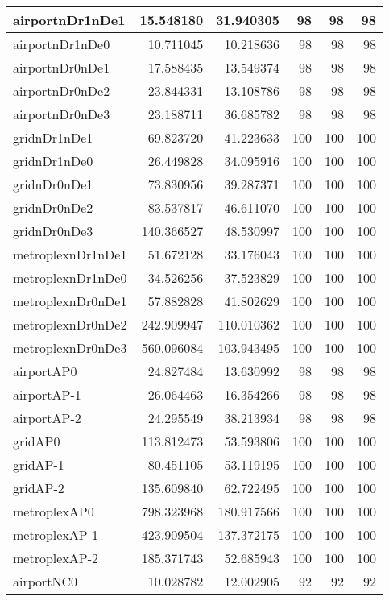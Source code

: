 \begin{longtable}{|l|r|r|r|r|r|}
\endlastfoot
airportnDr1nDe1 & 15.548180 & 31.940305 & 98 & 98 & 98 \\ \hline
airportnDr1nDe0 & 10.711045 & 10.218636 & 98 & 98 & 98 \\ \hline
airportnDr0nDe1 & 17.588435 & 13.549374 & 98 & 98 & 98 \\ \hline
airportnDr0nDe2 & 23.844331 & 13.108786 & 98 & 98 & 98 \\ \hline
airportnDr0nDe3 & 23.188711 & 36.685782 & 98 & 98 & 98 \\ \hline
gridnDr1nDe1 & 69.823720 & 41.223633 & 100 & 100 & 100 \\ \hline
gridnDr1nDe0 & 26.449828 & 34.095916 & 100 & 100 & 100 \\ \hline
gridnDr0nDe1 & 73.830956 & 39.287371 & 100 & 100 & 100 \\ \hline
gridnDr0nDe2 & 83.537817 & 46.611070 & 100 & 100 & 100 \\ \hline
gridnDr0nDe3 & 140.366527 & 48.530997 & 100 & 100 & 100 \\ \hline
metroplexnDr1nDe1 & 51.672128 & 33.176043 & 100 & 100 & 100 \\ \hline
metroplexnDr1nDe0 & 34.526256 & 37.523829 & 100 & 100 & 100 \\ \hline
metroplexnDr0nDe1 & 57.882828 & 41.802629 & 100 & 100 & 100 \\ \hline
metroplexnDr0nDe2 & 242.909947 & 110.010362 & 100 & 100 & 100 \\ \hline
metroplexnDr0nDe3 & 560.096084 & 103.943495 & 100 & 100 & 100 \\ \hline
airportAP0 & 24.827484 & 13.630992 & 98 & 98 & 98 \\ \hline
airportAP-1 & 26.064463 & 16.354266 & 98 & 98 & 98 \\ \hline
airportAP-2 & 24.295549 & 38.213934 & 98 & 98 & 98 \\ \hline
gridAP0 & 113.812473 & 53.593806 & 100 & 100 & 100 \\ \hline
gridAP-1 & 80.451105 & 53.119195 & 100 & 100 & 100 \\ \hline
gridAP-2 & 135.609840 & 62.722495 & 100 & 100 & 100 \\ \hline
metroplexAP0 & 798.323968 & 180.917566 & 100 & 100 & 100 \\ \hline
metroplexAP-1 & 423.909504 & 137.372175 & 100 & 100 & 100 \\ \hline
metroplexAP-2 & 185.371743 & 52.685943 & 100 & 100 & 100 \\ \hline
airportNC0 & 10.028782 & 12.002905 & 92 & 92 & 92 \\ \hline

\end{longtable}
